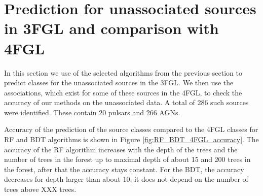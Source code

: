 \section{Prediction for unassociated sources in 3FGL and comparison with 4FGL}


In this section we use of the selected algorithms from the previous section to predict classes for the unassociated sources in the 3FGL. 
We then use the associations, which exist for some of these sources in the 4FGL, to check the accuracy of our methods on the unassociated data.  A total of 286 such sources were identified. These contain 20 pulsars and 266 AGNs.

Accuracy of the prediction of the source classes compared to the 4FGL classes for RF and BDT algorithms is shown in Figure \ref{fig:RF_BDT_4FGL_accuracy}.
The accuracy of the RF algorithm increases with the depth of the trees and the number of trees in the forest
up to maximal depth of about 15 and 200 trees in the forest, after that the accuracy stays constant.
For the BDT, the accuracy decreases for depth larger than about 10, it does not depend on the number of trees above XXX trees.


